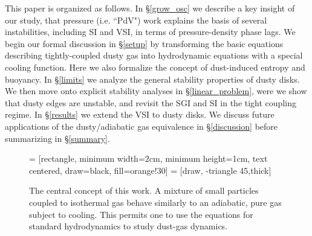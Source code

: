 \documentclass[iop, numberedappendix]{emulateapj}
\begin{document}
This paper is organized as follows. 
In \S\ref{grow_osc} 
we describe a key insight of our study, that pressure (i.e. ``PdV") work explains the basis of several instabilities, including SI and VSI, in terms of
pressure-density phase lags.   
We begin our formal discussion in \S\ref{setup} by transforming the
basic equations describing tightly-coupled dusty gas into
hydrodynamic equations with a special cooling function.  Here we also
formalize the concept of dust-induced entropy and buoyancy. 
In \S\ref{limits} we analyze the general stability properties of dusty
disks. We then move onto explicit stability analyses in
\S\ref{linear_problem}, were we show that dusty edges are unstable,
and revisit the SGI and SI in the tight
coupling regime. In \S\ref{results} we
extend the VSI to dusty disks. We   
discuss future applications of the dusty/adiabatic gas equivalence in 
\S\ref{discussion} before summarizing in \S\ref{summary}. 


\begin{figure}
 = [rectangle, minimum width=2cm, minimum height=1cm, text centered, draw=black, fill=orange!30]
   = [draw, -triangle 45,thick]  
  \begin{center}
 \end{center}
\caption{The central concept of this work. A mixture of small particles
  coupled to isothermal gas behave similarly to an adiabatic, pure gas
  subject to cooling.  This
  permits one to use the equations for standard hydrodynamics to study
  dust-gas dynamics. \label{concept_chart}}
\end{figure}
\end{document}

